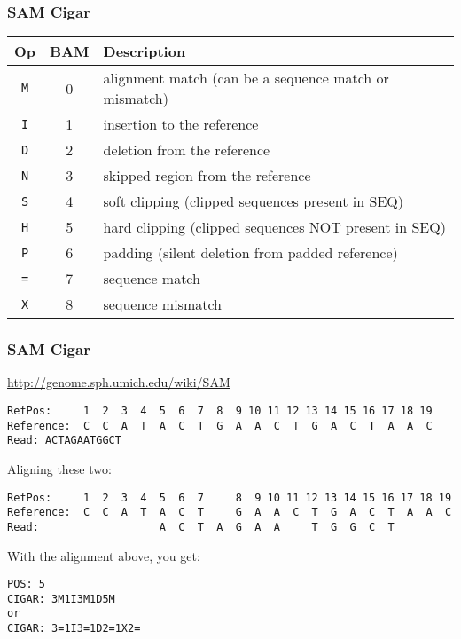 \documentclass{beamer}
\begin{document}
\begin{frame}[fragile] 
\frametitle{SAM Cigar}
\begin{center}\small
  \begin{tabular}{ccl}
  \hline
  Op & BAM & Description\\
  \hline
  {\tt M} & 0 & alignment match (can be a sequence match or mismatch)\\
  {\tt I} & 1 & insertion to the reference \\
  {\tt D} & 2 & deletion from the reference \\
  {\tt N} & 3 & skipped region from the reference \\
  {\tt S} & 4 & soft clipping (clipped sequences present in {\sf SEQ})\\
  {\tt H} & 5 & hard clipping (clipped sequences NOT present in {\sf SEQ})\\
  {\tt P} & 6 & padding (silent deletion from padded reference)\\
  {\tt =} & 7 & sequence match \\
  {\tt X} & 8 & sequence mismatch \\
  \hline
  \end{tabular}
  \end{center}
\end{frame}



\begin{frame} [fragile]
\frametitle{SAM Cigar}
\url{http://genome.sph.umich.edu/wiki/SAM}
\begin{tiny}
\begin{verbatim}
RefPos:     1  2  3  4  5  6  7  8  9 10 11 12 13 14 15 16 17 18 19
Reference:  C  C  A  T  A  C  T  G  A  A  C  T  G  A  C  T  A  A  C
Read: ACTAGAATGGCT
\end{verbatim}
\end{tiny}

Aligning these two:
\begin{tiny}
\begin{verbatim}
RefPos:     1  2  3  4  5  6  7     8  9 10 11 12 13 14 15 16 17 18 19
Reference:  C  C  A  T  A  C  T     G  A  A  C  T  G  A  C  T  A  A  C
Read:                   A  C  T  A  G  A  A     T  G  G  C  T
\end{verbatim}
\end{tiny}
With the alignment above, you get:
\begin{verbatim}
POS: 5
CIGAR: 3M1I3M1D5M
or
CIGAR: 3=1I3=1D2=1X2=
\end{verbatim}
\end{frame}
\end{document}

